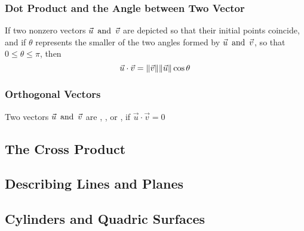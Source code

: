 \subsubsection*{Dot Product and the Angle between Two Vector}
If two nonzero vectors $\vec{u} \operatorname{~\text{and}~} \vec{v}$ are depicted so that their initial points coincide, and if $\theta$ represents the smaller of the two angles formed by $\vec{u} \operatorname{~\text{and}~} \vec{v}$, so that $0 \leq \theta \leq \pi$, then
\[
    \vec{u} \cdot \vec{v} = \lVert \vec{v} \rVert \lVert \vec{u} \rVert \cos \theta
\]

\subsubsection*{Orthogonal Vectors}
Two vectors $\vec{u} \operatorname{~\text{and}~} \vec{v}$ are , , or , if $\vec{u} \cdot \vec{v} = 0$

\subsection{The Cross Product}

\subsection{Describing Lines and Planes}

\subsection{Cylinders and Quadric Surfaces}